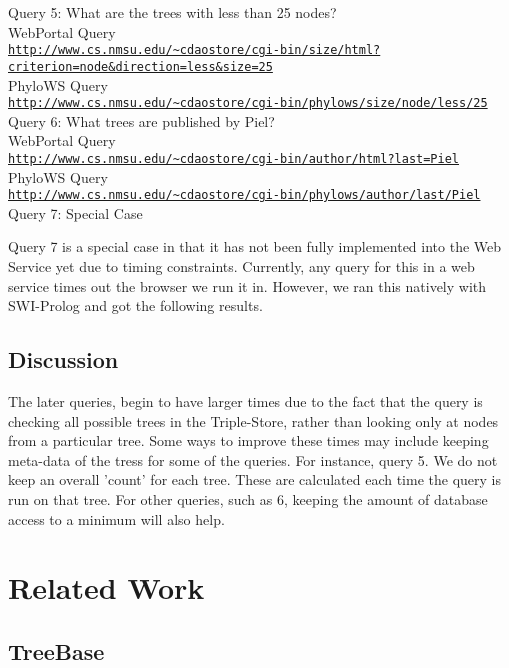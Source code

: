 \documentclass[10pt]{article}
\begin{document}
Query 5: What are the trees with less than 25 nodes?\\
 WebPortal Query \\
{\tt \url{http://www.cs.nmsu.edu/~cdaostore/cgi-bin/size/html?criterion=node&direction=less&size=25}}
\\PhyloWS Query\\
{\tt \url{http://www.cs.nmsu.edu/~cdaostore/cgi-bin/phylows/size/node/less/25}}
\\

Query 6: What trees are published by Piel?\\
 WebPortal Query \\
{\tt \url{http://www.cs.nmsu.edu/~cdaostore/cgi-bin/author/html?last=Piel}}
\\PhyloWS Query\\
{\tt \url{http://www.cs.nmsu.edu/~cdaostore/cgi-bin/phylows/author/last/Piel}}
\\

Query 7:  Special Case

Query 7 is a special case in that it has not been fully implemented into the
Web Service yet due to timing constraints.  Currently, any query for this in a
web service times out the browser we run it in.  However, we ran this natively
with SWI-Prolog and got the following results.

\subsection{Discussion}

The later queries, begin to have larger times due to the fact that the query is checking all possible trees in the Triple-Store, rather than looking only at nodes from a particular tree.  Some ways to improve these times may include keeping meta-data of the tress for some of the queries.  For instance, query 5.  We do not keep an overall 'count' for each tree. These are calculated each time the query is run on that tree.  For other queries, such as 6, keeping the amount of database access to a minimum will also help.

\section{Related Work}

\subsection{TreeBase}
\end{document}
